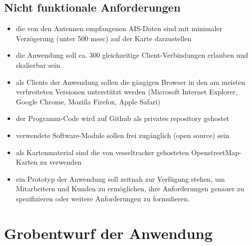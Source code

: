 \subsection{Nicht funktionale Anforderungen}\label{Nicht funktionale Anforderungen}
\begin{itemize}
\item die von den Antennen empfangenen AIS-Daten sind mit minimaler Verzögerung (unter 500 msec) auf der Karte darzustellen
\item die Anwendung soll ca. 300 gleichzeitige Client-Verbindungen erlauben und skalierbar sein
\item als Clients der Anwendung sollen die gängigen Browser in den am meisten verbreiteten Versionen unterstützt werden (Microsoft Internet Explorer, Google Chrome, Moziila Firefox, Apple Safari) 
\item der Programm-Code wird auf Github als privates repository gehostet
\item verwendete Software-Module sollen frei zugänglich (open source) sein 
\item als Kartenmaterial sind die von vesseltracker gehosteten OpenstreetMap-Karten zu verwenden
\item ein Prototyp der Anwendung soll zeitnah zur Verfügung stehen, um Mitarbeitern und Kunden zu ermöglichen, ihre Anforderungen genauer zu spezifizieren oder weitere Anforderungen zu formulieren.
\end{itemize}

\section{Grobentwurf der Anwendung}\label{s.Grobentwurf der Anwendung}

